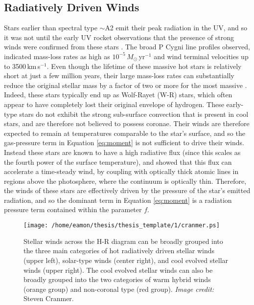 \subsection{Radiatively Driven Winds}\label{sec:1.4.1}
Stars earlier than spectral type $\sim$A2 emit their peak radiation in the UV, and so it was not until the early UV rocket observations that the presence of strong winds were confirmed from these stars \citep[e.g.,][]{morton_1967}. The broad P Cygni line profiles observed, indicated mass-loss rates as high as $10^{-5}\,M_{\odot}$\,yr$^{-1}$ and wind terminal velocities up to 3500\,km\,s$^{-1}$. Even though the lifetime of these massive hot stars is relatively short at just a few million years, their large mass-loss rates can substantially reduce the original stellar mass by a factor of two or more for the most massive \citep{owocki_2004}. Indeed, these stars typically end up as Wolf-Rayet (W-R) stars, which often appear to have completely lost their original envelope of hydrogen. These early-type stars do not exhibit the strong sub-surface convection that is present in cool stars, and are therefore not believed to possess coronae. Their winds are therefore expected to remain at temperatures comparable to the star's surface, and so the gas-pressure term in Equation \ref{eq:moment} is not sufficient to drive their winds. Instead these stars are known to have a high radiative flux (since this scales as the fourth power of the surface temperature), and \cite{castor_1975} showed that this flux can accelerate a time-steady wind, by coupling with optically thick atomic lines in regions above the photosphere, where the continuum is optically thin. Therefore, the winds of these stars are effectively driven by the pressure of the star's emitted radiation, and so the dominant term in Equation \ref{eq:moment} is a radiation pressure term contained within the parameter $f$.

\begin{figure}[t!]
\centering 
          \texttt{[image: /home/eamon/thesis/thesis\_template/1/cranmer.ps]}
\caption[Stellar winds across the H-R diagram]{Stellar winds across the H-R diagram can be broadly grouped into the three main categories of hot radiatively driven stellar winds (upper left), solar-type winds (center right), and cool evolved stellar winds (upper right). The cool evolved stellar winds can also be broadly grouped into the two categories of warm hybrid winds (orange group) and non-coronal type (red group). \textit{Image credit:} Steven Cranmer.}
\label{fig:1.2.3}
\end{figure}

